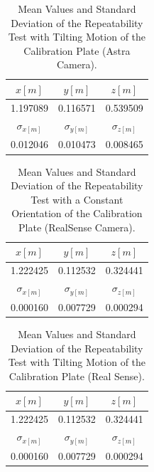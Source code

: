 \begin{table}[ht]
\renewcommand{\arraystretch}{1.3}
\caption{Mean Values and Standard Deviation of the Repeatability Test with Tilting Motion of the Calibration Plate (Astra Camera).}
\label{meanastra2}
\centering
\begin{tabular}{|c|c|c|}
\hline
$x[m]$ & $y[m]$ & $z[m]$ \\
\hline
1.197089&	0.116571&	0.539509 \\
\hline
\hline
$\sigma_{x[m]}$ & $\sigma_{y[m]}$ & $\sigma_{z[m]}$\\
\hline
0.012046&	0.010473&	0.008465\\
\hline
\end{tabular}
\end{table}



\begin{table}[ht]
\renewcommand{\arraystretch}{1.3}
\caption{Mean Values and Standard Deviation of the Repeatability Test with a Constant Orientation of the Calibration Plate (RealSense Camera).}
\label{meanreal1}
\centering
\begin{tabular}{|c|c|c|}
\hline
$x[m]$ & $y[m]$ & $z[m]$ \\
\hline
1.222425&	0.112532&	0.324441 \\
\hline
\hline
$\sigma_{x[m]}$ & $\sigma_{y[m]}$ & $\sigma_{z[m]}$ \\
\hline
0.000160&	0.007729&	0.000294\\
\hline
\end{tabular}
\end{table}




\begin{table}[ht]
\renewcommand{\arraystretch}{1.3}
\caption{Mean Values and Standard Deviation  of the Repeatability Test with Tilting Motion of the Calibration Plate (Real Sense).}
\label{meanreal2}
\centering
\begin{tabular}{|c|c|c|}
\hline
$x[m]$ & $y[m]$ & $z[m]$ \\
\hline
1.222425&	0.112532&	0.324441 \\
\hline
\hline
$\sigma_{x[m]}$ & $\sigma_{y[m]}$ & $\sigma_{z[m]}$ \\
\hline
0.000160&	0.007729&	0.000294\\
\hline
\end{tabular}
\end{table}



